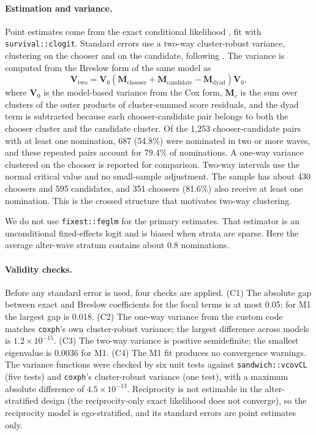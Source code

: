 \paragraph{Estimation and variance.}
Point estimates come from the exact conditional likelihood \citep{gail1981}, fit with \texttt{survival::clogit}. Standard errors use a two-way cluster-robust variance, clustering on the chooser and on the candidate, following \citet{cameron2011}. The variance is computed from the Breslow form of the same model \citep{breslow1974} as
\[
\mathbf{V}_{\text{two}} = \mathbf{V}_0 \left(\mathbf{M}_{\text{chooser}} + \mathbf{M}_{\text{candidate}} - \mathbf{M}_{\text{dyad}}\right) \mathbf{V}_0,
\]
where $\mathbf{V}_0$ is the model-based variance from the Cox form, $\mathbf{M}_{c}$ is the sum over clusters of the outer products of cluster-summed score residuals, and the dyad term is subtracted because each chooser-candidate pair belongs to both the chooser cluster and the candidate cluster. Of the 1,253 chooser-candidate pairs with at least one nomination, 687 (54.8\%) were nominated in two or more waves, and these repeated pairs account for 79.4\% of nominations. A one-way variance clustered on the chooser is reported for comparison. Two-way intervals use the normal critical value and no small-sample adjustment. The sample has about 430 choosers and 595 candidates, and 351 choosers (81.6\%) also receive at least one nomination. This is the crossed structure that motivates two-way clustering.

We do not use \texttt{fixest::feglm} for the primary estimates. That estimator is an unconditional fixed-effects logit and is biased when strata are sparse. Here the average alter-wave stratum contains about 0.8 nominations.

\paragraph{Validity checks.}
Before any standard error is used, four checks are applied. (C1) The absolute gap between exact and Breslow coefficients for the focal terms is at most 0.05; for M1 the largest gap is 0.018. (C2) The one-way variance from the custom code matches \texttt{coxph}'s own cluster-robust variance; the largest difference across models is $1.2 \times 10^{-15}$. (C3) The two-way variance is positive semidefinite; the smallest eigenvalue is 0.0036 for M1. (C4) The M1 fit produces no convergence warnings. The variance functions were checked by six unit tests against \texttt{sandwich::vcovCL} (five tests) and \texttt{coxph}'s cluster-robust variance (one test), with a maximum absolute difference of $4.5 \times 10^{-13}$. Reciprocity is not estimable in the alter-stratified design (the reciprocity-only exact likelihood does not converge), so the reciprocity model is ego-stratified, and its standard errors are point estimates only.

